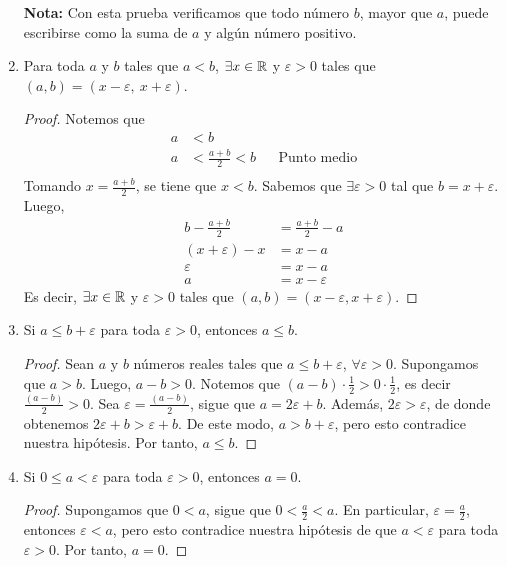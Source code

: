 \begin{enumerate}[label=\alph*)]
 \textbf{Nota:} Con esta prueba verificamos que todo número $b$, mayor que $a$, puede escribirse como la suma de $a$ y algún número positivo.
 
\clearpage\pagebreak
  
  \item Para toda $a$ y $b$ tales que $a<b$, $\exists x\in \mathbb{R}$ y $\varepsilon>0$ tales que $(a, b)= (x- \varepsilon, \ x+\varepsilon)$.
  \begin{proof}\leavevmode
    Notemos que
    \begin{align*}
      a &< b\\
      a &< \frac{a+b}{2} < b && \text{Punto medio}\\
    \end{align*}
    Tomando $x=\frac{a+b}{2}$, se tiene que $x<b$. Sabemos que $\exists \varepsilon>0$ tal que $b=x+\varepsilon$. Luego,
    \begin{align*}
      b-\frac{a+b}{2} &= \frac{a+b}{2}-a\\
      (x+\varepsilon) - x &= x - a\\
      \varepsilon &= x - a\\
      a &= x - \varepsilon
    \end{align*}
    Es decir, $\exists x\in \mathbb{R}$ y $\varepsilon>0$ tales que $(a, b)= (x- \varepsilon, x+\varepsilon)$.
  \end{proof}
    
  \item Si $a \leq b + \varepsilon$ para toda $\varepsilon > 0$, entonces $a \leq b$.
 
  \begin{proof} 
   Sean $a$ y $b$ números reales tales que $a \leq b + \varepsilon$, $\forall \varepsilon > 0$. Supongamos que $a > b$. Luego, $a-b>0$. Notemos que $(a-b) \cdot \frac{1}{2} > 0 \cdot \frac{1}{2}$, es decir $\frac{(a-b)}{2} > 0$. Sea $\varepsilon = \frac{(a-b)}{2}$, sigue que $a=2\varepsilon+b$. Además, $2\varepsilon > \varepsilon$, de donde obtenemos $2 \varepsilon + b > \varepsilon + b$. De este modo, $a > b+\varepsilon$, pero esto contradice nuestra hipótesis. Por tanto, $a \leq b$. 
  \end{proof}
  
 \item Si $0 \leq a < \varepsilon$ para toda $\varepsilon > 0$, entonces $a=0$.
 
 \begin{proof} 
  Supongamos que $0<a$, sigue que $0<\frac{a}{2}<a$. En particular, $\varepsilon=\frac{a}{2}$, entonces $\varepsilon<a$, pero esto contradice nuestra hipótesis de que $a< \varepsilon$ para toda $\varepsilon>0$. Por tanto, $a=0$. 
 \end{proof}


\end{enumerate}
